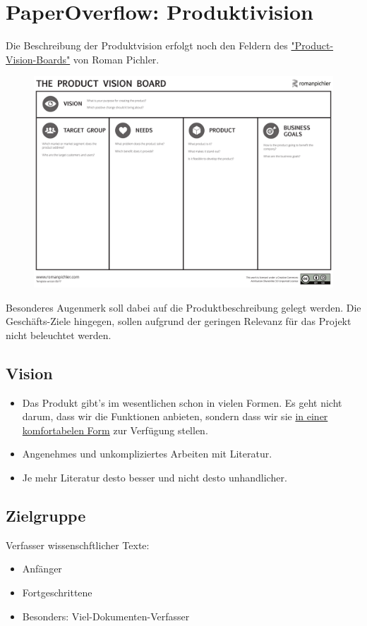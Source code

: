 \documentclass[a4paper,12pt]{article}
\begin{document}
\section{PaperOverflow: Produktivision}
Die Beschreibung der Produktvision erfolgt noch den Feldern des  \href{http://www.romanpichler.com/tools/vision-board/}{"Product-Vision-Boards"} von Roman Pichler. 
\begin{figure}[h!]
  \centering
  \includegraphics[width=0.7\linewidth]{res/PVB.pdf}
\end{figure}

Besonderes Augenmerk soll dabei auf die Produktbeschreibung gelegt werden.
Die Geschäfts-Ziele hingegen, sollen aufgrund der geringen Relevanz für das Projekt nicht beleuchtet werden.
\subsection{Vision}
\begin{itemize}
\item Das Produkt gibt's im wesentlichen schon in vielen Formen. Es geht nicht darum, dass wir die Funktionen anbieten, sondern dass wir sie \underline{in einer komfortabelen Form} zur Verfügung stellen.
\item Angenehmes und unkompliziertes Arbeiten mit Literatur.
\item Je mehr Literatur desto besser und nicht desto unhandlicher.
\end{itemize}

\subsection{Zielgruppe}
Verfasser wissenschftlicher Texte:
\begin{itemize}
	\item  Anfänger
	\item Fortgeschrittene
	\item Besonders: Viel-Dokumenten-Verfasser
\end{itemize}
\end{document}
